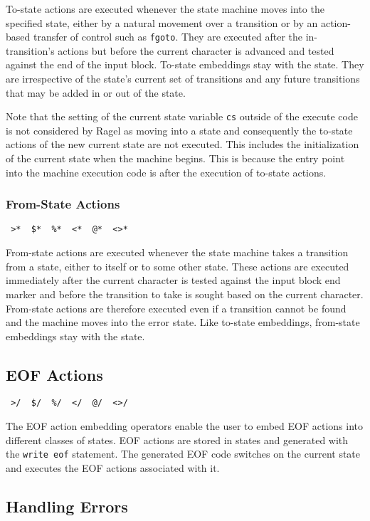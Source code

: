 \documentclass[letterpaper,11pt,oneside]{book}
\newcommand{\verbspace}{\vspace{10pt}}
\begin{document}
To-state actions are executed whenever the state machine moves into the
specified state, either by a natural movement over a transition or by an
action-based transfer of control such as \verb|fgoto|. They are executed after the
in-transition's actions but before the current character is advanced and
tested against the end of the input block. To-state embeddings stay with the
state. They are irrespective of the state's current set of transitions and any
future transitions that may be added in or out of the state.

Note that the setting of the current state variable \verb|cs| outside of the
execute code is not considered by Ragel as moving into a state and consequently
the to-state actions of the new current state are not executed. This includes
the initialization of the current state when the machine begins.  This is
because the entry point into the machine execution code is after the execution
of to-state actions.

\subsubsection{From-State Actions}

\verb| >*  $*  %*  <*  @*  <>* |
\verbspace

From-state actions are executed whenever the state machine takes a transition from a
state, either to itself or to some other state. These actions are executed
immediately after the current character is tested against the input block end
marker and before the transition to take is sought based on the current
character. From-state actions are therefore executed even if a transition
cannot be found and the machine moves into the error state.  Like to-state
embeddings, from-state embeddings stay with the state.

\subsection{EOF Actions}

\verb| >/  $/  %/  </  @/  <>/ | 
\verbspace

The EOF action embedding operators enable the user to embed EOF actions into
different classes of
states.  EOF actions are stored in states and generated with the \verb|write eof|
statement. The generated EOF code switches on the current state and executes the EOF
actions associated with it.

\subsection{Handling Errors}
\end{document}
